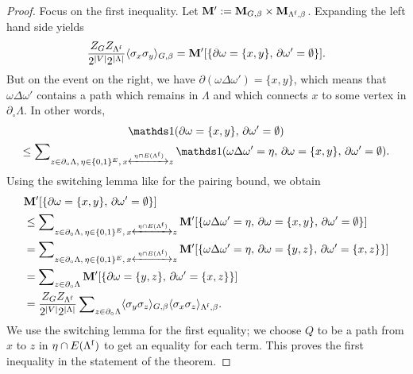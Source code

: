 \begin{proof}
    Focus on the first inequality.
    Let $\mathbf{M}':=\mathbf{M}_{G,\beta}\times\mathbf{M}_{\Lambda^{\operatorname{f}},\beta}$.
    Expanding the left hand side yields
    \[
        \frac{Z_GZ_{\Lambda^{\operatorname{f}}}}{2^{|V|}2^{|\Lambda|}}
        \langle\sigma_x\sigma_y\rangle_{G,\beta}
        =
        \mathbf{M}'[\{\partial\omega=\{x,y\},\,\partial\omega'=\emptyset\}].
    \]
    But on the event on the right,
    we have $\partial(\omega\Delta\omega')=\{x,y\}$,
    which means that $\omega\Delta\omega'$ contains a path
    which remains in $\Lambda$
    and which connects $x$ to some vertex in $\partial_\circ\Lambda$.
    In other words,
    \begin{multline}
        \label{eq:converse}
        \true{\partial\omega=\{x,y\},\,\partial\omega'=\emptyset}
        \\
        \leq
        \sum\nolimits_{z\in\partial_\circ\Lambda,\,\eta\in\{0,1\}^E,\,x\xleftrightarrow{\eta\cap E(\Lambda^\f)}z}
        \true{\omega\Delta\omega'=\eta,\,\partial\omega=\{x,y\},\,\partial\omega'=\emptyset}.
    \end{multline}
    Using the switching lemma like for the pairing bound,
    we obtain
    \begin{align}
        &\mathbf{M}'[\{\partial\omega=\{x,y\},\,\partial\omega'=\emptyset\}]
        \\&
        \leq 
        \sum\nolimits_{z\in\partial_\circ\Lambda,\,\eta\in\{0,1\}^E,\,x\xleftrightarrow{\eta\cap E(\Lambda^{\operatorname{f}})}z}
        \mathbf{M}'[
        \{\omega\Delta\omega'=\eta,\,\partial\omega=\{x,y\},\,\partial\omega'=\emptyset\}]
        \\&
        =
        \sum\nolimits_{z\in\partial_\circ\Lambda,\,\eta\in\{0,1\}^E,\,x\xleftrightarrow{\eta\cap E(\Lambda^{\operatorname{f}})}z}
        \mathbf{M}'[
        \{\omega\Delta\omega'=\eta,\,\partial\omega=\{y,z\},\,\partial\omega'=\{x,z\}\}]
        \\&
        =
        \sum\nolimits_{z\in\partial_\circ\Lambda}
        \mathbf{M}'[
        \{\partial\omega=\{y,z\},\,\partial\omega'=\{x,z\}\}]
        \\&=
        \frac{Z_GZ_{\Lambda^{\operatorname{f}}}}{2^{|V|}2^{|\Lambda|}}
        \sum\nolimits_{z\in\partial_\circ\Lambda}
        \langle\sigma_y\sigma_z\rangle_{G,\beta}
        \langle\sigma_x\sigma_z\rangle_{\Lambda^{\operatorname{f}},\beta}.
    \end{align}
    We use the switching lemma for the first equality;
    we choose $Q$ to be a path from $x$ to $z$ in $\eta\cap E(\Lambda^{\operatorname{f}})$
    to get an equality for each term.
    This proves the first inequality in the statement of the theorem.


\end{proof}
